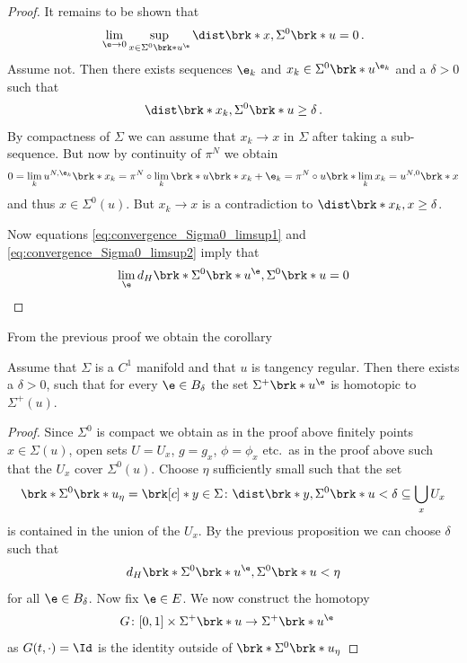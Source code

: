\begin{proof}
  It remains to be shown that
  \begin{align}
    \lim_{\e\to0}\sup_{x\in\Sigma^0\brk*{u^\e}}\dist\brk*{x,\Sigma^0\brk*{u}}=0\,.
    \label{eq:convergence_Sigma0_limsup2}
  \end{align}
  Assume not. Then there exists sequences $\e_k$ and $x_k\in\Sigma^0\brk*{u^{\e_k}}$ and a $\delta>0$ such that
  \begin{align}
    \dist\brk*{x_k,\Sigma^0\brk*{u}}\geq\delta\,.
  \end{align}
  By compactness of $\Sigma$ we can assume that $x_k\to x$ in $\Sigma$ after taking a sub-sequence. 
  But now by continuity of $\pi^N$ we obtain
  \begin{align}
    0=\lim_{k}u^{N,\e_k}\brk*{x_k}
    =\pi^N\circ\lim_{k}\brk*{u\brk*{x_k}+\e_k}
    =\pi^N\circ u\brk*{\lim_kx_k}
    =u^{N,0}\brk*{x}
  \end{align}
  and thus $x\in\Sigma^0(u)$. But $x_k\to x$ is a contradiction to $\dist\brk*{x_k,x}\geq\delta$.

  Now equations \eqref{eq:convergence_Sigma0_limsup1} and \eqref{eq:convergence_Sigma0_limsup2} imply that
  \begin{align}
    \lim_\e d_H\brk*{\Sigma^0\brk*{u^\e},\Sigma^0\brk*{u}}=0
  \end{align}
\end{proof}

From the previous proof we obtain the corollary
\begin{corollary}\label{co:tanReg_homotopy}
  Assume that $\Sigma$ is a $C^1$ manifold and that $u$ is tangency regular.
  Then there exists a $\delta>0$, such that for every
  $\e\in B_\delta$ the set $\Sigma^+\brk*{u^\e}$ is homotopic to $\Sigma^+(u)$.
\end{corollary}
\begin{proof}
  Since $\Sigma^0$ is compact we obtain as in the proof above finitely points $x\in\Sigma(u)$,
  open sets $U=U_x$,
  $g=g_x$, $\phi=\phi_x$ etc.\ as in the proof above such that the $U_x$ cover $\Sigma^0(u)$.
  Choose $\eta$ sufficiently small such that the set
  \begin{align}
    \brk*{\Sigma^0\brk*{u}}_\eta=\brk[c]*{y\in\Sigma\colon \dist\brk*{y,\Sigma^0\brk*{u}}<\delta}\subseteq \bigcup_xU_x
  \end{align}
  is contained in the union of the $U_x$. By the previous proposition we can choose $\delta$ such that 
  \begin{align}
    d_H\brk*{\Sigma^0\brk*{u^\e},\Sigma^0\brk*{u}}<\eta
  \end{align}
  for all $\e\in B_\delta$. Now fix $\e\in E$.
  We now construct the homotopy
  \begin{align}
    G\colon [0,1]\times\Sigma^+\brk*{u}&\to\Sigma^+\brk*{u^\e}
  \end{align}
  as $G(t,\cdot)=\Id$ is the identity outside of $\brk*{\Sigma^0\brk*{u}}_\eta$ 
\end{proof}

